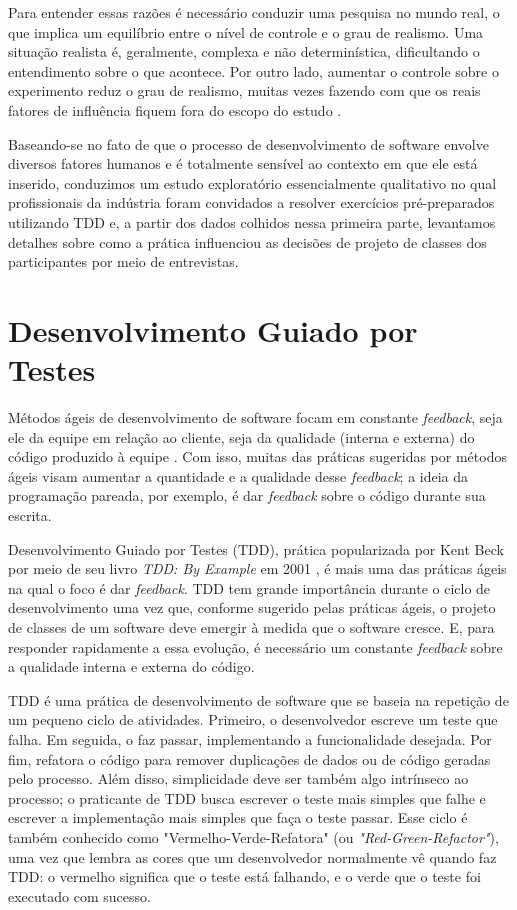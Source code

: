 \documentclass[conference]{IEEEtran}
\begin{document}
Para entender essas razões é necessário
conduzir uma pesquisa no mundo real, o que  
implica um equilíbrio entre o nível de controle
e o grau de realismo. Uma situação realista é, geralmente, complexa e 
não determinística, dificultando o entendimento sobre o que acontece. Por outro
lado, aumentar o controle sobre o experimento reduz o grau de realismo, muitas
vezes fazendo com que os reais fatores de influência fiquem fora do escopo do 
estudo \cite{guidelines-case-study}.

Baseando-se no fato de que o processo de desenvolvimento de software envolve 
diversos fatores humanos e é totalmente sensível ao contexto em que ele está 
inserido, 
conduzimos um estudo exploratório essencialmente qualitativo 
no qual profissionais da indústria foram convidados a resolver exercícios 
pré-preparados utilizando TDD e, a partir 
dos dados colhidos nessa primeira parte, levantamos detalhes sobre como a prática influenciou as 
decisões de projeto de classes dos participantes por meio de 
entrevistas.


\section{Desenvolvimento Guiado por Testes}

Métodos ágeis de desenvolvimento de software focam em constante
\textit{feedback}, seja ele da equipe em relação ao cliente, seja da
qualidade (interna e externa) do código produzido à equipe \cite{AgileManifesto}.
Com isso, muitas das práticas sugeridas por métodos ágeis visam aumentar a 
quantidade e a qualidade desse \textit{feedback}; a ideia da programação pareada, por
exemplo, é dar \textit{feedback} sobre o código durante sua escrita.

Desenvolvimento Guiado por Testes (TDD), prática popularizada por Kent Beck por meio de seu livro
\textit{TDD: By Example} em 2001 \cite{TDDByExample}, é mais uma das práticas
ágeis na qual o foco é dar \textit{feedback}. TDD tem grande importância durante o ciclo
de desenvolvimento uma vez que, conforme sugerido pelas práticas ágeis, o projeto de classes de um
software deve emergir à medida que o software cresce. E, para responder
rapidamente a essa evolução, é necessário um constante \textit{feedback} sobre a
qualidade interna e externa do código.

TDD é uma prática de desenvolvimento de software que se baseia na repetição de
um pequeno ciclo de atividades. Primeiro, o desenvolvedor escreve um
teste que falha. Em seguida, o faz passar, implementando a
funcionalidade desejada. Por fim, refatora o código para remover
duplicações de dados ou de código geradas pelo processo.
Além disso, simplicidade deve ser também algo intrínseco ao processo; o praticante de TDD
busca escrever o teste mais simples que falhe e escrever a implementação mais simples
que faça o teste passar.
Esse ciclo
é também conhecido como 
"Vermelho-Verde-Refatora" (ou \textit{"Red-Green-Refactor"}), uma vez que lembra as cores que um 
desenvolvedor normalmente vê quando faz TDD: o vermelho significa que
o teste está falhando, e o verde que o teste foi executado com sucesso.
\end{document}

